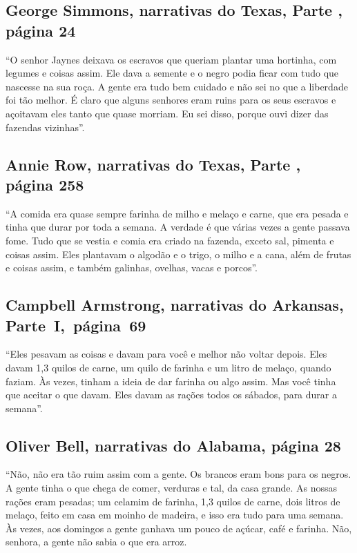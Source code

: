 \subsection{George Simmons, narrativas do Texas, Parte , página 24}
\label{ref239}

``O senhor Jaynes deixava os escravos que queriam plantar uma hortinha,
com legumes e coisas assim. Ele dava a semente e o negro podia ficar com
tudo que nascesse na sua roça. A gente era tudo bem cuidado e não sei no
que a liberdade foi tão melhor. É claro que alguns senhores eram ruins
para os seus escravos e açoitavam eles tanto que quase morriam. Eu sei
disso, porque ouvi dizer das fazendas vizinhas''.

\subsection{Annie Row, narrativas do Texas, Parte , página 258}
\label{ref229}

``A comida era quase sempre farinha de milho e melaço e carne, que era
pesada e tinha que durar por toda a semana. A verdade é que várias vezes
a gente passava fome. Tudo que se vestia e comia era criado na fazenda,
exceto sal, pimenta e coisas assim. Eles plantavam o algodão e o trigo,
o milho e a cana, além de frutas e coisas assim, e também galinhas,
ovelhas, vacas e porcos''.

\subsection{Campbell Armstrong, narrativas do Arkansas, Parte~I,~página~69} \label{ref10}

``Eles pesavam as coisas e davam para você e melhor não voltar depois.
Eles davam 1,3 quilos de carne, um quilo de farinha e um litro de melaço,
quando faziam. Às vezes, tinham a ideia de dar farinha ou algo assim.
Mas você tinha que aceitar o que davam. Eles davam as rações todos os
sábados, para durar a semana''.

\subsection{Oliver Bell, narrativas do Alabama, página 28} \label{ref24}

``Não, não era tão ruim assim com a gente. Os brancos eram bons para os
negros. A gente tinha o que chega de comer, verduras e tal, da casa %
grande. As nossas rações eram pesadas; um celamim de farinha, 1,3 quilos de
carne, dois litros de melaço, feito em casa em moinho de madeira, e isso
era tudo para uma semana. Às vezes, aos domingos a gente ganhava um
pouco de açúcar, café e farinha. Não, senhora, a gente não sabia o que
era arroz.

